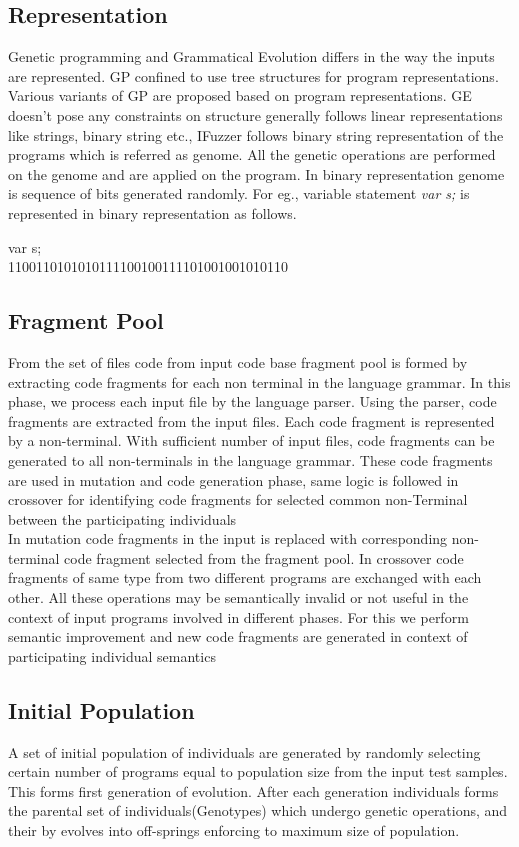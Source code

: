 \documentclass{sig-alternate}
\begin{document}
\subsection{Representation}
\indent Genetic programming and Grammatical Evolution differs in the way the inputs are represented. GP confined to use tree structures for program representations. Various variants of GP are proposed based on program representations. GE doesn't pose any constraints on structure generally follows linear representations like strings, binary string etc., IFuzzer follows binary string representation of the programs which is referred as genome. All the genetic operations are performed on the genome and are applied on the program.  In binary representation genome is sequence of bits generated randomly. For eg., variable statement \textit{var s;} is represented in binary representation as follows.
\begin{center}
var s;
\\1100110101010111100100111101001001010110
\end{center}

\subsection{Fragment Pool}
\indent From the set of files code from input code base fragment pool is formed by extracting code fragments for each non terminal in the language grammar. In this phase, we process each input file by the language parser. Using the parser, code fragments are extracted from the input files. Each code fragment is represented by a non-terminal. With sufficient number of input files, code fragments can be generated to all non-terminals in the language grammar. These code fragments are used in mutation and code generation phase, same logic is followed in crossover for identifying code fragments for selected common non-Terminal between the participating individuals\\
\indent In mutation code fragments in the input is replaced with corresponding non-terminal code fragment selected from the fragment pool. In crossover code fragments of same type from two different programs are exchanged with each other. All these operations may be semantically invalid  or not useful in the context of input programs involved in different phases. For this we perform semantic improvement and new code fragments are generated in context of participating individual semantics

\subsection{Initial Population}
\indent A set of initial population of individuals are generated by randomly selecting certain number of programs equal to population size from the input test samples. This forms first generation of evolution. After each generation individuals forms the parental set of individuals(Genotypes) which undergo genetic operations, and their by evolves into off-springs enforcing to maximum size of population.
\end{document}
